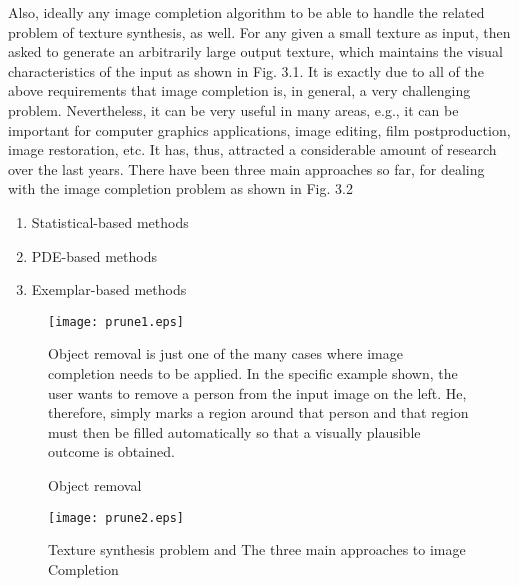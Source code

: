 Also, ideally any image completion algorithm to be able to handle the related problem of texture synthesis, as
well. For any  given a small texture as input,  then asked to generate an arbitrarily large output texture, which maintains the visual characteristics of the input as shown in Fig. 3.1. It is exactly due to all of the above requirements that image completion is, in general, a very challenging problem.
Nevertheless, it can be very useful in many areas, e.g., it can be important for computer graphics applications, image editing,
film postproduction, image restoration, etc. It has, thus, attracted a considerable amount of research over
the last years.  There have been three main approaches so far, for dealing with the image completion problem
as shown in Fig. 3.2
\begin{enumerate}
  \item Statistical-based methods
  \item PDE-based methods
  \item Exemplar-based methods
\end{enumerate}
\begin{figure}
  \texttt{[image: prune1.eps]}\\
  \caption{Object removal}\label{}
Object removal is just one of the many cases where image completion
needs to be applied. In the specific example shown, the user wants to remove a
person from the input image on the left. He, therefore, simply marks a region
around that person and that region must then be filled automatically so that a
visually plausible outcome is obtained.
\end{figure}
\begin{figure}
  \texttt{[image: prune2.eps]}\\
  \caption{Texture synthesis problem and The three main approaches to image
Completion}\label{}
\end{figure}




